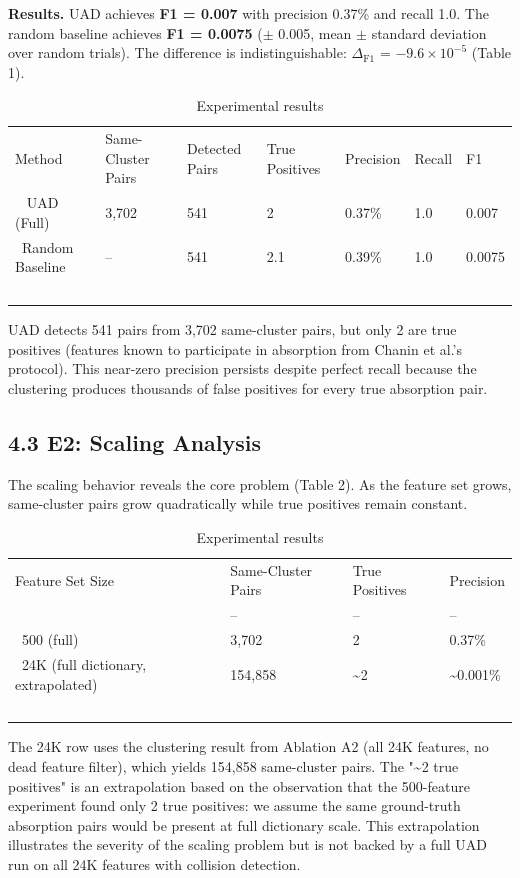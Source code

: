 \documentclass{article}
\begin{document}
\textbf{Results.} UAD achieves \textbf{F1 = 0.007} with precision 0.37\% and recall 1.0. The random baseline achieves \textbf{F1 = 0.0075} ($\pm$ 0.005, mean $\pm$ standard deviation over random trials). The difference is indistinguishable: $\Delta_{\text{F1}}$ = $-9.6 \times 10^{-5}$ (Table 1).

\begin{table}[ht]
\centering
\small
\begin{tabular}{lllllll}
\toprule
Method & Same-Cluster Pairs & Detected Pairs & True Positives & Precision & Recall & F1 \\\
\midrule
UAD (Full) & 3,702 & 541 & 2 & 0.37\% & 1.0 & 0.007 \\\
Random Baseline & -- & 541 & 2.1 & 0.39\% & 1.0 & 0.0075 \\\
\bottomrule
\end{tabular}
\caption{Experimental results}
\end{table}

UAD detects 541 pairs from 3,702 same-cluster pairs, but only 2 are true positives (features known to participate in absorption from Chanin et al.'s protocol). This near-zero precision persists despite perfect recall because the clustering produces thousands of false positives for every true absorption pair.

\subsection{4.3 E2: Scaling Analysis}

The scaling behavior reveals the core problem (Table 2). As the feature set grows, same-cluster pairs grow quadratically while true positives remain constant.

\begin{table}[ht]
\centering
\small
\begin{tabular}{llll}
\toprule
Feature Set Size & Same-Cluster Pairs & True Positives & Precision \\\
\midrule
100 & -- & -- & -- \\\
500 (full) & 3,702 & 2 & 0.37\% \\\
24K (full dictionary, extrapolated) & 154,858 & \textasciitilde{}2 & \textasciitilde{}0.001\% \\\
\bottomrule
\end{tabular}
\caption{Experimental results}
\end{table}

The 24K row uses the clustering result from Ablation A2 (all 24K features, no dead feature filter), which yields 154,858 same-cluster pairs. The "\textasciitilde{}2 true positives" is an extrapolation based on the observation that the 500-feature experiment found only 2 true positives: we assume the same ground-truth absorption pairs would be present at full dictionary scale. This extrapolation illustrates the severity of the scaling problem but is not backed by a full UAD run on all 24K features with collision detection.
\end{document}
